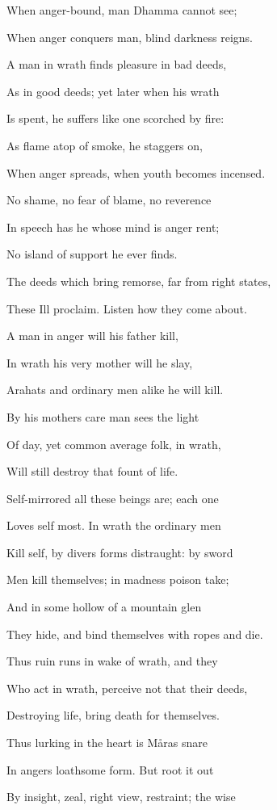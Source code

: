 \documentclass[12pt,twoside]{article}
\begin{document}
When anger{}-bound, man Dhamma cannot see;

When anger conquers man, blind darkness reigns. 

A man in wrath finds pleasure in bad deeds, 

As in good deeds; yet later when his wrath

Is spent, he suffers like one scorched by fire:

As flame atop of smoke, he staggers on, 

When anger spreads, when youth becomes incensed.

No shame, no fear of blame, no reverence

In speech has he whose mind is anger rent;

No island of support he ever finds.

The deeds which bring remorse, far from right states,

These I{\textquotesingle}ll proclaim. Listen how they come about.

A man in anger will his father kill,

In wrath his very mother will he slay,

Arahats and ordinary men alike he will kill. 

By his mother{\textquotesingle}s care man sees the light

Of day, yet common average folk, in wrath, 

Will still destroy that fount of life. 

Self{}-mirrored all these beings are; each one

Loves self most. In wrath the ordinary men 

Kill self, by divers forms distraught: by sword 

Men kill themselves; in madness poison take;

And in some hollow of a mountain glen

They hide, and bind themselves with ropes and die. 

Thus ruin runs in wake of wrath, and they

Who act in wrath, perceive not that their deeds, 

Destroying life, bring death for themselves. 

Thus lurking in the heart is M{\aa}ra{\textquotesingle}s snare

In anger{\textquotesingle}s loathsome form. But root it out 

By insight, zeal, right view, restraint; the wise
\end{document}
